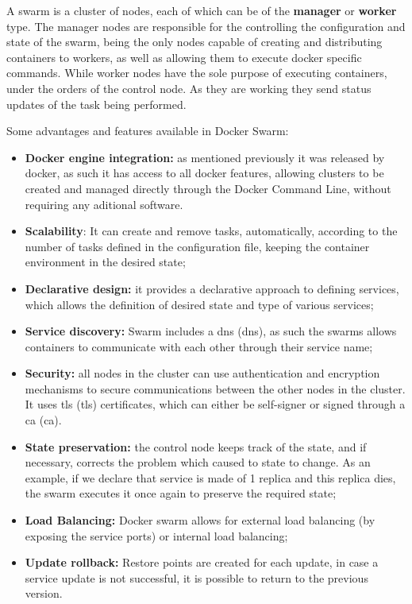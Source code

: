 A swarm is a cluster of nodes, each of which can be of the \textbf{manager} or \textbf{worker} type. The manager nodes are responsible for the controlling the configuration and state of the swarm, being the only nodes capable of creating and distributing containers to workers, as well as allowing them to execute docker specific commands. While worker nodes have the sole purpose of executing containers, under the orders of the control node. As they are working they send status updates of the task being performed.

Some advantages and features available in Docker Swarm:

\begin{itemize}
    \item \textbf{Docker engine integration:} as mentioned previously it was released by docker, as such it has access to all docker features, allowing clusters to be created and managed directly through the Docker Command Line, without requiring any aditional software.
    \item \textbf{Scalability}: It can create and remove tasks, automatically, according to the number of tasks defined in the configuration file, keeping the container environment in the desired state;
    \item \textbf{Declarative design:} it provides a declarative approach to defining services, which allows the definition of desired state and type of various services;
    \item \textbf{Service discovery:} Swarm includes a \acrlong{dns} (\acrshort{dns}), as such the swarms allows containers to communicate with each other through their service name;
    \item \textbf{Security:} all nodes in the cluster can use authentication and encryption mechanisms to secure communications between the other nodes in the cluster. It uses \acrlong{tls} (\acrshort{tls}) certificates, which can either be self-signer or signed through a \acrlong{ca} (\acrshort{ca}).
    \item \textbf{State preservation:} the control node keeps track of the state, and if necessary, corrects the problem which caused to state to change. As an example, if we declare that service is made of 1 replica and this replica dies, the swarm executes it once again to preserve the required state;
    \item \textbf{Load Balancing:} Docker swarm allows for external load balancing (by exposing the service ports) or internal load balancing;
    \item \textbf{Update rollback:} Restore points are created for each update, in case a service update is not successful, it is possible to return to the previous version.
\end{itemize}

